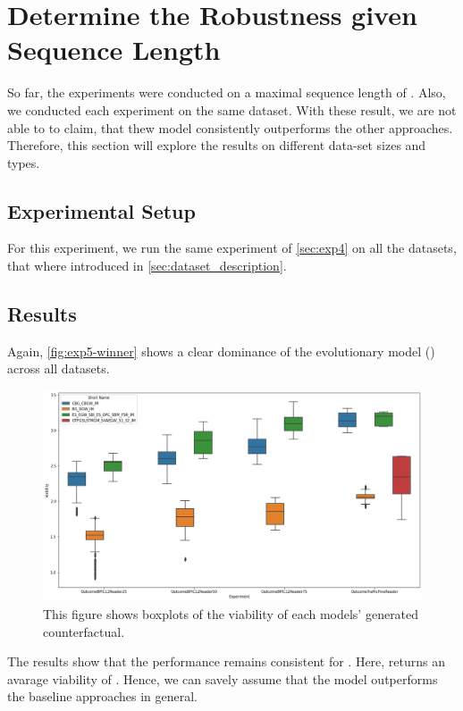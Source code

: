 \documentclass[./../../paper.tex]{subfiles}
\begin{document}
\section{Determine the Robustness given Sequence Length}
So far, the experiments were conducted on a maximal sequence length of . Also, we conducted each experiment on the same dataset.  With these result, we are not able to to claim, that thew model consistently outperforms the other approaches.  Therefore, this section will explore the results on different data-set sizes and types.


\subsection{Experimental Setup}
For this experiment, we run the same experiment of \autoref{sec:exp4} on all the datasets, that where introduced in \autoref{sec:dataset_description}.

\subsection{Results}
Again, \autoref{fig:exp5-winner} shows a clear dominance of the evolutionary model  () across all datasets. 

\begin{figure}[htbp]
    \centering
    \includegraphics[width=\textwidth]{figures/generated/exp5_winner_overall.png}
    \caption{This figure shows boxplots of the viability of each models' generated counterfactual.}
    \label{fig:exp5-winner}
\end{figure}

The results show that the performance remains consistent for . Here,  returns an avarage viability of . Hence, we can savely assume that the model outperforms the baseline approaches in general. 
\end{document}

